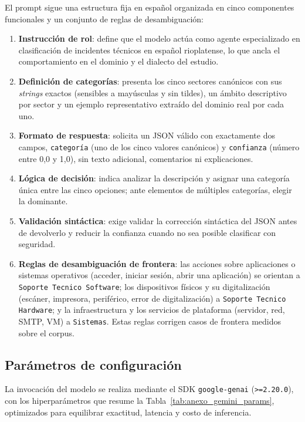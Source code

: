 El prompt sigue una estructura fija en español organizada en cinco componentes funcionales y un conjunto de reglas de desambiguación:

\begin{enumerate}
  \item \textbf{Instrucción de rol}: define que el modelo actúa como agente especializado en clasificación de incidentes técnicos en español rioplatense, lo que ancla el comportamiento en el dominio y el dialecto del estudio.
  \item \textbf{Definición de categorías}: presenta los cinco sectores canónicos con sus \emph{strings} exactos (sensibles a mayúsculas y sin tildes), un ámbito descriptivo por sector y un ejemplo representativo extraído del dominio real por cada uno.
  \item \textbf{Formato de respuesta}: solicita un JSON válido con exactamente dos campos, \texttt{categoría} (uno de los cinco valores canónicos) y \texttt{confianza} (número entre 0,0 y 1,0), sin texto adicional, comentarios ni explicaciones.
  \item \textbf{Lógica de decisión}: indica analizar la descripción y asignar una categoría única entre las cinco opciones; ante elementos de múltiples categorías, elegir la dominante.
  \item \textbf{Validación sintáctica}: exige validar la corrección sintáctica del JSON antes de devolverlo y reducir la confianza cuando no sea posible clasificar con seguridad.
  \item \textbf{Reglas de desambiguación de frontera}: las acciones sobre aplicaciones o sistemas operativos (acceder, iniciar sesión, abrir una aplicación) se orientan a \texttt{Soporte Tecnico Software}; los dispositivos físicos y su digitalización (escáner, impresora, periférico, error de digitalización) a \texttt{Soporte Tecnico Hardware}; y la infraestructura y los servicios de plataforma (servidor, red, SMTP, VM) a \texttt{Sistemas}. Estas reglas corrigen casos de frontera medidos sobre el corpus.
\end{enumerate}

\subsection{Parámetros de configuración}\label{subsec:anexo-parametros-config}

La invocación del modelo se realiza mediante el SDK \texttt{google-genai} (\texttt{>=2.20.0}), con los hiperparámetros que resume la Tabla~\ref{tab:anexo_gemini_params}, optimizados para equilibrar exactitud, latencia y costo de inferencia.


